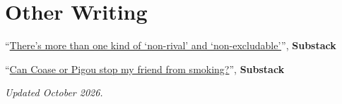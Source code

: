 \documentclass[10pt,letterpaper]{article}
\def\updated{October 2026}
\renewenvironment{itemize}{
  \begin{list}{}{
    \setlength{\leftmargin}{1.5em}
    \setlength{\topsep}{3pt}
    \setlength{\itemsep}{3pt}
    \setlength{\parsep}{0pt}
  }
}{
  \end{list}
}
\begin{document}
\section*{Other Writing}
\begin{itemize}
  \item ``\href{https://andresdeloera.substack.com/p/theres-more-than-one-kind-of-non}{There's more than one kind of `non-rival' and `non-excludable'}\thinspace'', \textbf{Substack}
  \item ``\href{https://andresdeloera.substack.com/p/can-coase-or-pigou-stop-my-friend}{Can Coase or Pigou stop my friend from smoking?}'', \textbf{Substack}
\end{itemize}

\vspace{1.5em}
{\small\itshape Updated \updated.}
\end{document}
